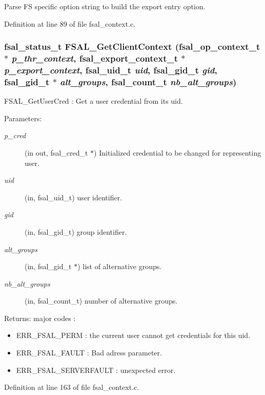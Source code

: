 Parse FS specific option string to build the export entry option. 

Definition at line 89 of file fsal\_\-context.c.
\subsubsection[{FSAL\_\-GetClientContext}]{\setlength{\rightskip}{0pt plus 5cm}fsal\_\-status\_\-t FSAL\_\-GetClientContext (fsal\_\-op\_\-context\_\-t $\ast$ {\em p\_\-thr\_\-context}, \/  fsal\_\-export\_\-context\_\-t $\ast$ {\em p\_\-export\_\-context}, \/  fsal\_\-uid\_\-t {\em uid}, \/  fsal\_\-gid\_\-t {\em gid}, \/  fsal\_\-gid\_\-t $\ast$ {\em alt\_\-groups}, \/  fsal\_\-count\_\-t {\em nb\_\-alt\_\-groups})}\label{group__FSALCredFunctions_gc9d7f36333e895d045a6e484589fda10}


FSAL\_\-GetUserCred : Get a user credential from its uid.

\begin{Desc}
\item[Parameters:]
\begin{description}
\item[{\em p\_\-cred}](in out, fsal\_\-cred\_\-t $\ast$) Initialized credential to be changed for representing user. \item[{\em uid}](in, fsal\_\-uid\_\-t) user identifier. \item[{\em gid}](in, fsal\_\-gid\_\-t) group identifier. \item[{\em alt\_\-groups}](in, fsal\_\-gid\_\-t $\ast$) list of alternative groups. \item[{\em nb\_\-alt\_\-groups}](in, fsal\_\-count\_\-t) number of alternative groups.\end{description}
\end{Desc}
\begin{Desc}
\item[Returns:]major codes :\begin{itemize}
\item ERR\_\-FSAL\_\-PERM : the current user cannot get credentials for this uid.\item ERR\_\-FSAL\_\-FAULT : Bad adress parameter.\item ERR\_\-FSAL\_\-SERVERFAULT : unexpected error. \end{itemize}
\end{Desc}


Definition at line 163 of file fsal\_\-context.c.